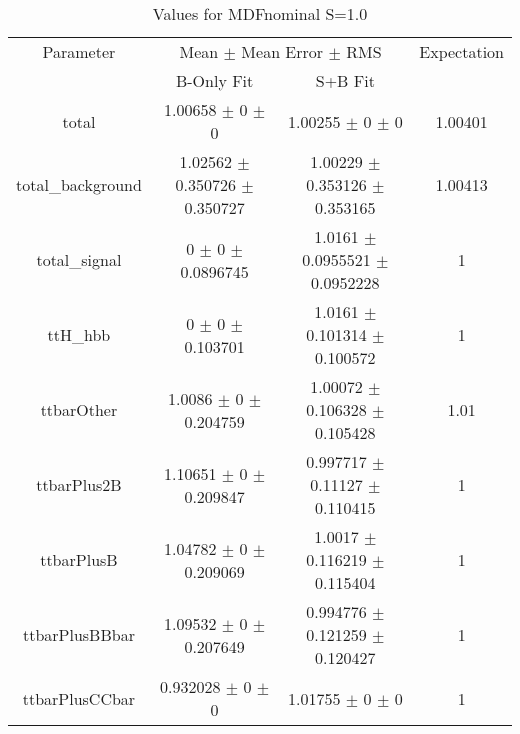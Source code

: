 \begin{table}
\centering
\caption{Values for MDFnominal S=1.0}
\begin{tabular}{cccc}
\toprule
Parameter & \multicolumn{2}{c}{Mean $\pm$ Mean Error $\pm$ RMS} & Expectation\\
 & B-Only Fit & S+B Fit & \\
\midrule
total & \num{1.00658} $\pm$ \num{0} $\pm$ \num{0} & \num{1.00255} $\pm$ \num{0} $\pm$ \num{0} & \num{1.00401}\\
total\_background & \num{1.02562} $\pm$ \num{0.350726} $\pm$ \num{0.350727} & \num{1.00229} $\pm$ \num{0.353126} $\pm$ \num{0.353165} & \num{1.00413}\\
total\_signal & \num{0} $\pm$ \num{0} $\pm$ \num{0.0896745} & \num{1.0161} $\pm$ \num{0.0955521} $\pm$ \num{0.0952228} & \num{1}\\
ttH\_hbb & \num{0} $\pm$ \num{0} $\pm$ \num{0.103701} & \num{1.0161} $\pm$ \num{0.101314} $\pm$ \num{0.100572} & \num{1}\\
ttbarOther & \num{1.0086} $\pm$ \num{0} $\pm$ \num{0.204759} & \num{1.00072} $\pm$ \num{0.106328} $\pm$ \num{0.105428} & \num{1.01}\\
ttbarPlus2B & \num{1.10651} $\pm$ \num{0} $\pm$ \num{0.209847} & \num{0.997717} $\pm$ \num{0.11127} $\pm$ \num{0.110415} & \num{1}\\
ttbarPlusB & \num{1.04782} $\pm$ \num{0} $\pm$ \num{0.209069} & \num{1.0017} $\pm$ \num{0.116219} $\pm$ \num{0.115404} & \num{1}\\
ttbarPlusBBbar & \num{1.09532} $\pm$ \num{0} $\pm$ \num{0.207649} & \num{0.994776} $\pm$ \num{0.121259} $\pm$ \num{0.120427} & \num{1}\\
ttbarPlusCCbar & \num{0.932028} $\pm$ \num{0} $\pm$ \num{0} & \num{1.01755} $\pm$ \num{0} $\pm$ \num{0} & \num{1}\\
\bottomrule
\end{tabular}
\end{table}